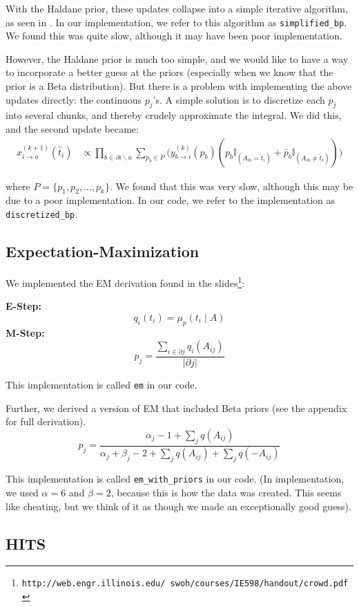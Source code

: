 \documentclass[11pt]{article}
\begin{document}
With the Haldane prior, these updates collapse into a simple iterative algorithm, as seen in \cite{karger2014budget}. In our implementation, we refer to this algorithm as \texttt{simplified\_bp}. We found this was quite slow, although it may have been poor implementation. 

However, the Haldane prior is much too simple, and we would like to have a way to incorporate a better guess at the priors (especially when we know that the prior is a Beta distribution). But there is a problem with implementing the above updates directly: the continuous $p_j$'s. A simple solution is to discretize each $p_j$ into several chunks, and thereby crudely approximate the integral. We did this, and the second update became:
\begin{align*}
x^{(k+1)}_{i \to a}(\hat{t}_i) &\propto \prod_{b \in \partial i\backslash a} \sum_{p_b \in P} \Big(y_{b \to i}^{(k)}(p_b)(p_b \mathbb{I}_{(A_{ib}=\hat{t}_i)} + \bar{p}_b \mathbb{I}_{(A_{ib}\neq\hat{t}_i)})\Big)
\end{align*}

where $P=\{p_1, p_2, ..., p_k\}$. We found that this was very slow, although this may be due to a poor implementation. In our code, we refer to the implementation as \texttt{discretized\_bp}. 


\subsection{Expectation-Maximization}
We implemented the EM derivation found in the slides\footnote{\texttt{http://web.engr.illinois.edu/~swoh/courses/IE598/handout/crowd.pdf}}:

\noindent\textbf{E-Step:} 
\[q_i(t_i) = \mu_p(t_i \mid A)\]
\textbf{M-Step:} 
\[
p_j = \frac{\sum_{i \in \partial j} q_i(A_{ij})}{| \partial j |}
\]

This implementation is called \texttt{em} in our code.

Further, we derived a version of EM that included Beta priors (see the appendix for full derivation).
\[
p_j = \frac{ \alpha_j - 1 + \sum_jq(A_{ij}) }{ \alpha_j + \beta_j-2 + \sum_jq(A_{ij})  + \sum_j q(-A_{ij})  }
\]

This implementation is called \texttt{em\_with\_priors} in our code. (In implementation, we used $\alpha = 6$ and $\beta = 2$, because this is how the data was created. This seems like cheating, but we think of it as though we made an exceptionally good guess).

\subsection{HITS}
\end{document}
